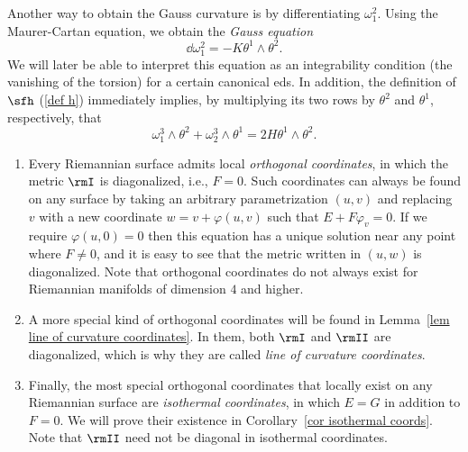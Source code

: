 Another way to obtain the Gauss curvature is by differentiating $\omega_1^2$. Using the Maurer-Cartan equation, we obtain the \emph{Gauss equation}
\[\boxed{\dd\omega_1^2=-K\theta^1\wedge\theta^2.}\label{eq 2.14 Ivey}\]
We will later be able to interpret this equation as an integrability condition (the vanishing of the torsion) for a certain canonical \gls{eds}. In addition, the definition of $\sfh$ (\ref{def h}) immediately implies, by multiplying its two rows by $\theta^2$ and $\theta^1$, respectively, that
\[\omega_1^3\wedge\theta^2+\omega_2^3\wedge\theta^1=2H\theta^1\wedge\theta^2.\]

\begin{rem}
    \begin{enumerate}
        \item Every Riemannian surface admits local \emph{orthogonal coordinates}, in which the metric $\rmI$ is diagonalized, i.e., $F=0$. 
        Such coordinates can always be found on any surface by taking an arbitrary parametrization $(u,v)$ and replacing $v$ with a new coordinate $w=v+\varphi(u,v)$ such that $E+F\varphi_v=0$. If we require $\varphi(u,0)=0$ then this equation has a unique solution near any point where $F\neq 0$, and it is easy to see that the metric written in $(u,w)$ is diagonalized. Note that orthogonal coordinates do not always exist for Riemannian manifolds of dimension $4$ and higher.
        \item A more special kind of orthogonal coordinates will be found in Lemma~\ref{lem line of curvature coordinates}. In them, both $\rmI$ and $\rmII$ are diagonalized, which is why they are called \emph{line of curvature coordinates}.
        \item Finally, the most special orthogonal coordinates that locally exist on any Riemannian surface are \emph{isothermal coordinates}, in which $E=G$ in addition to $F=0$. We will prove their existence in Corollary~\ref{cor isothermal coords}. Note that $\rmII$ need not be diagonal in isothermal coordinates.
    \end{enumerate}
\end{rem}

